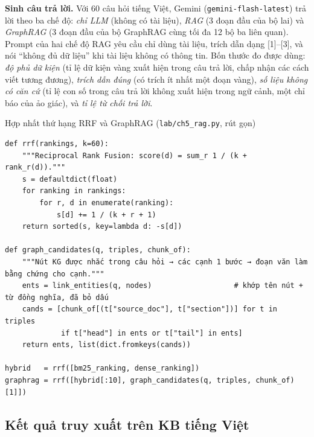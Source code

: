 \textbf{Sinh câu trả lời.} Với 60 câu hỏi tiếng Việt, Gemini (\texttt{gemini-flash-latest}) trả lời theo ba chế độ: \emph{chỉ LLM} (không có tài liệu), \emph{RAG} (3 đoạn đầu của bộ lai) và \emph{GraphRAG} (3 đoạn đầu của bộ GraphRAG cùng tối đa 12 bộ ba liên quan). Prompt của hai chế độ RAG yêu cầu chỉ dùng tài liệu, trích dẫn dạng [1]–[3], và nói ``không đủ dữ liệu'' khi tài liệu không có thông tin. Bốn thước đo được dùng: \emph{độ phủ dữ kiện} (tỉ lệ dữ kiện vàng xuất hiện trong câu trả lời, chấp nhận các cách viết tương đương), \emph{trích dẫn đúng} (có trích ít nhất một đoạn vàng), \emph{số liệu không có căn cứ} (tỉ lệ con số trong câu trả lời không xuất hiện trong ngữ cảnh, một chỉ báo của ảo giác), và \emph{tỉ lệ từ chối trả lời}.

\begin{code}{Hợp nhất thứ hạng RRF và GraphRAG (\texttt{lab/ch5\_rag.py}, rút gọn)}
\label{lst:ch5-rrf}
\begin{verbatim}
def rrf(rankings, k=60):
    """Reciprocal Rank Fusion: score(d) = sum_r 1 / (k + rank_r(d))."""
    s = defaultdict(float)
    for ranking in rankings:
        for r, d in enumerate(ranking):
            s[d] += 1 / (k + r + 1)
    return sorted(s, key=lambda d: -s[d])

def graph_candidates(q, triples, chunk_of):
    """Nút KG được nhắc trong câu hỏi → các cạnh 1 bước → đoạn văn làm bằng chứng cho cạnh."""
    ents = link_entities(q, nodes)                   # khớp tên nút + từ đồng nghĩa, đã bỏ dấu
    cands = [chunk_of[(t["source_doc"], t["section"])] for t in triples
             if t["head"] in ents or t["tail"] in ents]
    return ents, list(dict.fromkeys(cands))

hybrid   = rrf([bm25_ranking, dense_ranking])
graphrag = rrf([hybrid[:10], graph_candidates(q, triples, chunk_of)[1]])
\end{verbatim}
\end{code}

\subsection{Kết quả truy xuất trên KB tiếng Việt}

